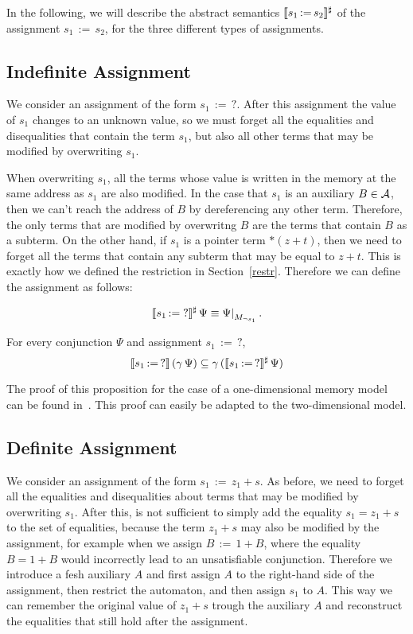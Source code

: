 In the following, we will describe the abstract semantics $\llbracket s_1\,{:=}\,s_2\rrbracket^\sharp$ of the assignment $s_1\,{:=}\,s_2$, for the three different types of assignments.

\subsection{Indefinite Assignment}

We consider an assignment of the form $s_1\,{:=}\,?$.
After this assignment the value of $s_1$ changes to an unknown value, so we must forget all the equalities and disequalities that contain the term $s_1$, but also all other terms that may be modified by overwriting $s_1$.

When overwriting $s_1$, all the terms whose value is written in the memory at the same address as $s_1$ are also modified.
In the case that $s_1$ is an auxiliary $B \in \mathcal{A}$, then we can't reach the address of $B$ by dereferencing any other term.
Therefore, the only terms that are modified by overwritng $B$ are the terms that contain $B$ as a subterm.
On the other hand, if $s_1$ is a pointer term $*(z+t)$, then we need to forget all the terms that contain any subterm that may be equal to $z+t$.
This is exactly how we defined the restriction in Section~\ref{restr}.
Therefore we can define the assignment as follows:

\[
	\sem{s_1\,{:=}\;?}^\sharp\,\Psi \equiv \restr{\Psi}{M_{\neg s_1}}.
\]

\begin{proposition}\label{p:ass-unknown}
	For every conjunction $\Psi$ and assignment $s_1\,{:=}\,?$,
	\[
		\llbracket s_1\,{:=}\,?\rrbracket\,(\gamma\,\Psi) \subseteq \gamma\,(\llbracket s_1\,{:=}\,?\rrbracket^\sharp\,\Psi)
	\]
\end{proposition}

The proof of this proposition for the case of a one-dimensional memory model can be found in~\cite{2pointer}.
This proof can easily be adapted to the two-dimensional model.

\subsection{Definite Assignment}

We consider an assignment of the form $s_1\,{:=}\,z_1+s$.
As before, we need to forget all the equalities and disequalities about terms that may be modified by overwriting $s_1$.
After this, is not sufficient to simply add the equality $s_1 = z_1+s$ to the set of equalities, because the term $z_1 + s$ may also be modified by the assignment, for example when we assign $B\,{:=}\,1+B$, where the equality $B = 1 + B$ would incorrectly lead to an unsatisfiable conjunction.
Therefore we introduce a fesh auxiliary $A$ and first assign $A$ to the right-hand side of the assignment, then restrict the automaton, and then assign $s_1$ to $A$.
This way we can remember the original value of $z_1 + s$ trough the auxiliary $A$ and reconstruct the equalities that still hold after the assignment.

